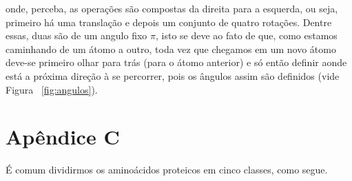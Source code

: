\documentclass[a4paper,12pt]{article}
\begin{document}
 	onde, perceba, as operações são compostas da direita para a esquerda, ou seja, primeiro há uma translação e depois um conjunto de quatro rotações. Dentre essas, duas são de um angulo fixo $\pi$, isto se deve ao fato de que, como estamos caminhando de um átomo a outro, toda vez que chegamos em um novo átomo deve-se primeiro olhar para trás (para o átomo anterior) e só então definir aonde está a próxima direção à se percorrer, pois os ângulos assim são definidos (vide Figura ~\ref{fig:angulos}).
 	
 	\newpage
 	\section*{Apêndice C} 
 	
 	É comum dividirmos os aminoácidos proteicos em cinco classes, como segue.
\end{document}
